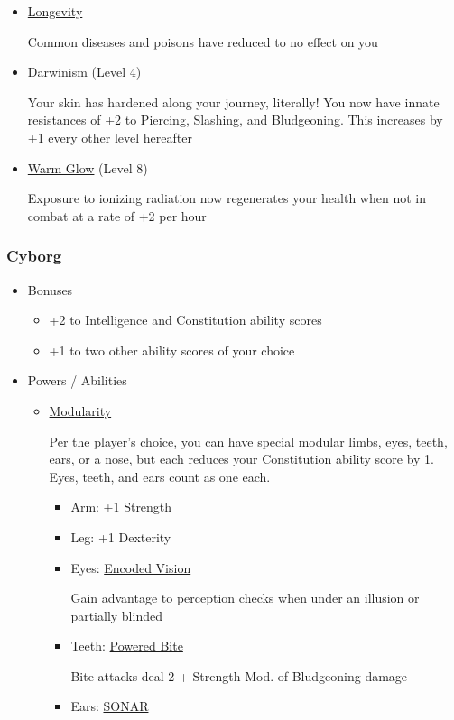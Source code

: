 \documentclass[12pt, landscape]{article}
\begin{document}
\begin{FlushLeft}
\begin{multicols}{2}
\begin{itemize}
\begin{itemize}
					\item \underline{Longevity}

					Common diseases and poisons have reduced to no effect on you

					\item \underline{Darwinism} (Level 4)

					Your skin has hardened along your journey, literally! You now have innate resistances of +2 to Piercing, Slashing, and Bludgeoning. This increases by +1 every other level hereafter

					\item \underline{Warm Glow} (Level 8)

					Exposure to ionizing radiation now regenerates your health when not in combat at a rate of +2 per hour
				\end{itemize}
			\end{itemize}

			\subsubsection{Cyborg}
			\begin{itemize}
				\item Bonuses
				\begin{itemize}
					\item +2 to Intelligence and Constitution ability scores
					\item +1 to two other ability scores of your choice
				\end{itemize}
				\item Powers / Abilities
				\begin{itemize}
					\item \underline{Modularity}

					Per the player’s choice, you can have special modular limbs, eyes, teeth, ears, or a nose, but each reduces your Constitution ability score by 1. Eyes, teeth, and ears count as one each.
					\vfill \null \columnbreak
					\begin{itemize}
						\item Arm: +1 Strength
						\item Leg: +1 Dexterity
						\item Eyes: \underline{Encoded Vision}

						Gain advantage to perception checks when under an illusion or partially blinded
						\item Teeth: \underline{Powered Bite}

						Bite attacks deal 2 + Strength Mod. of Bludgeoning damage
						\item Ears: \underline{SONAR}


\end{itemize}
\end{itemize}
\end{itemize}
\end{multicols}
\end{FlushLeft}
\end{document}
